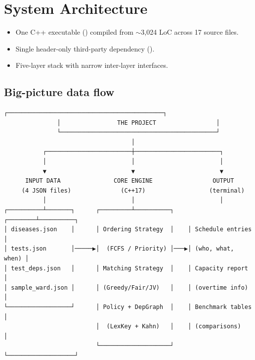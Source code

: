\section{System Architecture}
\label{sec:architecture}

\begin{itemize}
  \item One C++ executable () compiled
        from $\sim$3{,}024 LoC across 17 source files.
  \item Single header-only third-party dependency
        ().
  \item Five-layer stack with narrow inter-layer interfaces.
\end{itemize}

\subsection{Big-picture data flow}

\begin{center}
  \begin{tcolorbox}[enhanced, breakable=false,
                    colback=boxbg, colframe=ruleblue,
                    boxrule=0.4pt, arc=2pt,
                    left=4pt, right=4pt, top=2pt, bottom=2pt]
\centering
\begin{BVerbatim}[fontsize=\scriptsize]
               ┌────────────────────────────────────────────┐
               │                THE PROJECT                 │
               └────────────────────────────────────────────┘
                                    │
           ┌────────────────────────┼────────────────────────┐
           │                        │                        │
           ▼                        ▼                        ▼
      INPUT DATA               CORE ENGINE                 OUTPUT
     (4 JSON files)              (C++17)                  (terminal)
           │                        │                        │
┌──────────┴───────┐      ┌─────────┴──────────┐    ┌────────┴──────────┐
│ diseases.json    │      │ Ordering Strategy  │    │ Schedule entries  │
│ tests.json       │─────▶│  (FCFS / Priority) │───▶│ (who, what, when) │
│ test_deps.json   │      │ Matching Strategy  │    │ Capacity report   │
│ sample_ward.json │      │ (Greedy/Fair/JV)   │    │ (overtime info)   │
└──────────────────┘      │ Policy + DepGraph  │    │ Benchmark tables  │
                          │  (LexKey + Kahn)   │    │ (comparisons)     │
                          └────────────────────┘    └───────────────────┘
\end{BVerbatim}
  \end{tcolorbox}
\end{center}

